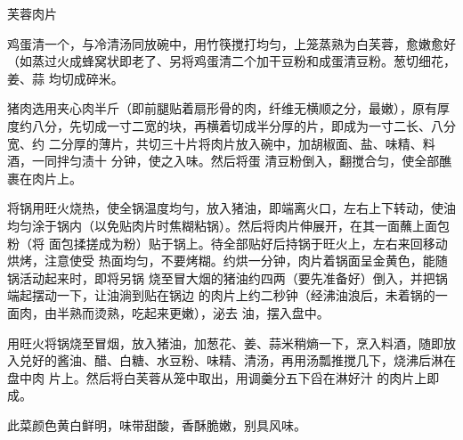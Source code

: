 \begin{recipe}{芙蓉肉片}

\ingredients


\cooking

\step 鸡蛋清一个，与冷清汤同放碗中，用竹筷搅打均匀，上笼蒸熟为白芙蓉，愈嫩愈好
（如蒸过火成蜂窝状即老了、另将鸡蛋清二个加干豆粉和成蛋清豆粉。葱切细花，姜、蒜
均切成碎米。

\step 猪肉选用夹心肉半斤（即前腿贴着扇形骨的肉，纤维无横顺之分，最嫩），原有厚
度约八分，先切成一寸二宽的块，再横着切成半分厚的片，即成为一寸二长、八分宽、约
二分厚的薄片，共切三十片将肉片放入碗中，加胡椒面、盐、味精、料酒，一同拌匀渍十
分钟，使之入味。然后将蛋 清豆粉倒入，翻搅合匀，使全部醮裹在肉片上。

\step 将锅用旺火烧热，使全锅温度均勻，放入猪油，即端离火口，左右上下转动，使油
均匀涂于锅内（以免贴肉片时焦糊粘锅）。然后将肉片伸展开，在其一面蘸上面包粉（将
面包揉搓成为粉）贴于锅上。待全部贴好后持锅于旺火上，左右来回移动烘烤，注意使受
热面均匀，不要烤糊。约烘一分钟，肉片着锅面呈金黄色，能随锅活动起来时，即将另锅
烧至冒大烟的猪油约四两（要先准备好）倒入，并把锅端起摆动一下，让油淌到贴在锅边
的肉片上约二秒钟（经沸油浪后，未着锅的一面肉，由半熟而烫熟，吃起来更嫩），泌去
油，摆入盘中。

\step 用旺火将锅烧至冒烟，放入猪油，加葱花、姜、蒜米稍熵一下，烹入料酒，随即放
入兑好的酱油、醋、白糖、水豆粉、味精、清汤，再用汤瓢推搅几下，烧沸后淋在盘中肉
片上。然后将白芙蓉从笼中取出，用调羹分五下舀在淋好汁 的肉片上即成。

\notes

此菜颜色黄白鲜明，味带甜酸，香酥脆嫩，别具风味。

\end{recipe}


